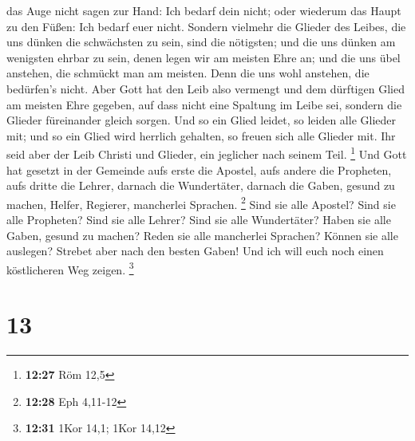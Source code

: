 das Auge nicht sagen zur Hand: Ich bedarf dein nicht; oder wiederum das
Haupt zu den Füßen: Ich bedarf euer nicht.  Sondern
vielmehr die Glieder des Leibes, die uns dünken die schwächsten zu sein,
sind die nötigsten;  und die uns dünken am wenigsten
ehrbar zu sein, denen legen wir am meisten Ehre an; und die uns übel
anstehen, die schmückt man am meisten.  Denn die uns wohl
anstehen, die bedürfen's nicht. Aber Gott hat den Leib also vermengt und
dem dürftigen Glied am meisten Ehre gegeben,  auf dass
nicht eine Spaltung im Leibe sei, sondern die Glieder füreinander gleich
sorgen.  Und so ein Glied leidet, so leiden alle Glieder
mit; und so ein Glied wird herrlich gehalten, so freuen sich alle
Glieder mit.  Ihr seid aber der Leib Christi und Glieder,
ein jeglicher nach seinem Teil. \footnote{\textbf{12:27} Röm 12,5}
 Und Gott hat gesetzt in der Gemeinde aufs erste die
Apostel, aufs andere die Propheten, aufs dritte die Lehrer, darnach die
Wundertäter, darnach die Gaben, gesund zu machen, Helfer, Regierer,
mancherlei Sprachen. \footnote{\textbf{12:28} Eph 4,11-12}
 Sind sie alle Apostel? Sind sie alle Propheten? Sind sie
alle Lehrer? Sind sie alle Wundertäter?  Haben sie alle
Gaben, gesund zu machen? Reden sie alle mancherlei Sprachen? Können sie
alle auslegen?  Strebet aber nach den besten Gaben! Und
ich will euch noch einen köstlicheren Weg zeigen. \footnote{\textbf{12:31}
  1Kor 14,1; 1Kor 14,12}

\hypertarget{section-12}{%
\section{13}\label{section-12}}

